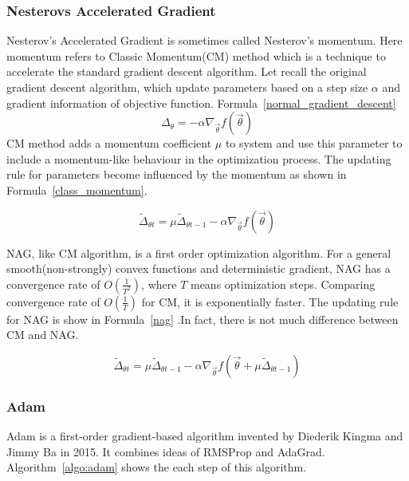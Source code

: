 \documentclass[officiallayout]{tktla}
\begin{document}
\subsubsection{Nesterovs Accelerated Gradient}
Nesterov's Accelerated Gradient is sometimes called Nesterov's momentum. Here momentum refers to Classic Momentum(CM) method which is a technique to accelerate the standard gradient descent algorithm. Let recall the original gradient descent algorithm, which update parameters based on a step size $\alpha$ and gradient information of objective function. Formula~\ref{normal_gradient_descent}
\begin{equation}
\Delta_\theta = -\alpha \nabla_{\vec{\theta}} f(\vec{\theta})
\label{normal_gradient_descent}
\end{equation}
CM method adds a momentum coefficient $\mu$ to system and use this parameter to include a momentum-like behaviour in the optimization process. The updating rule for parameters become influenced by the momentum as shown in Formula~\ref{class_momentum}.

\begin{equation}
\widetilde{\Delta}_{\theta t} =  \mu \widetilde{\Delta}_{\theta {t-1}}  -\alpha \nabla_{\vec{\theta}} f(\vec{\theta})
\label{class_momentum}
\end{equation}

NAG, like CM algorithm, is a first order optimization algorithm. For a general smooth(non-strongly) convex functions and deterministic gradient, NAG has a convergence rate of $O(\frac{1}{T^2})$, where $T$ means optimization steps. Comparing convergence rate of $O(\frac{1}{T})$ for CM, it is exponentially faster. The updating rule for NAG is show in Formula~\ref{nag} .In fact, there is not much difference between CM and NAG. 

\begin{equation}
\widetilde{\Delta}_{\theta t} =  \mu \widetilde{\Delta}_{\theta {t-1}}  -\alpha \nabla_{\vec{\theta}} f(\vec{\theta} + \mu \widetilde{\Delta}_{\theta {t-1}})
\label{nag}
\end{equation}

\subsubsection{Adam}
Adam is a first-order gradient-based algorithm \cite{kingma2014adam} invented by 	Diederik Kingma and Jimmy Ba in 2015. It combines ideas of RMSProp\cite{tieleman2012lecture} and AdaGrad\cite{duchi2011adaptive}. Algorithm~\ref{algo:adam} shows the each step of this algorithm.
\end{document}

